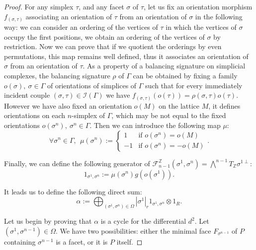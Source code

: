 \documentclass{article}
\begin{document}
\begin{proof}
    For any simplex $\tau$, and any facet $\sigma$ of $\tau$, let us fix an orientation morphism $f_{(\sigma,\tau)}$ associating an orientation of $\tau$ from an orientation of $\sigma$ in the following way: we can consider an ordering of the vertices of $\tau$ in which the vertices of $\sigma$ occupy the first positions, we obtain an ordering of the vertices of $\sigma$ by restriction. Now we can prove that if we quotient the orderings by even permutations, this map remains well defined, thus it associates an orientation of $\sigma$ from an orientation of $\tau$. As a property of a balancing signature on simplicial complexes, the balancing signature $\rho$ of $\Gamma$ can be obtained by fixing a family $o(\sigma),~ \sigma \in \Gamma$ of orientations of simplices of $\Gamma$ such that for every immediately incident couple $(\sigma,\tau) \in \mathcal{I}(\Gamma)$ we have $f_{(\sigma,\tau)}(o(\tau))=\rho(\sigma,\tau)o(\tau)$. However we have also fixed an orientation $o(M)$ on the lattice $M$, it defines orientations on each $n$-simplex of $\Gamma$, which may be not equal to the fixed orientations $o(\sigma^n),~\sigma^n \in \Gamma$. Then we can introduce the following map $\mu$:
    \begin{equation*}
        \forall \sigma^n \in \Gamma, ~~ \mu(\sigma^n):= \left \{ \begin{array}{ll}
            1 & \text{if } o(\sigma^n) = o(M) \\
            -1 &  \text{if } o(\sigma^{n}) = -o(M)
        \end{array} \right. .
    \end{equation*}
    
    Finally, we can define the following generator of $\mathcal{F}_{n-1}^{\mathbb{Z}}(\sigma^1,\sigma^n) = \bigwedge^{n-1}T_{\mathbb{Z}}\sigma^{1\perp}$:
    \begin{equation*}
        1_{\sigma^1,\sigma^n}:= \mu(\sigma^n)g(o(\sigma^1)) .
    \end{equation*}

    It leads us to define the following direct sum:
    \begin{equation*}
        \alpha:= \bigoplus_{(\sigma^1,\sigma^n) \in \Omega} |\sigma^1|_r1_{\sigma^1,\sigma^n} \otimes 1_R .
    \end{equation*}

    Let us begin by proving that $\alpha$ is a cycle for the differential $d^{2}$. Let $(\sigma^1,\sigma^{n-1}) \in \Omega$. We have two possibilities: either the minimal face $F_{\sigma^{n-1}}$ of $P$ containing $\sigma^{n-1}$ is a facet, or it is $P$ itself.
    

\end{proof}
\end{document}
